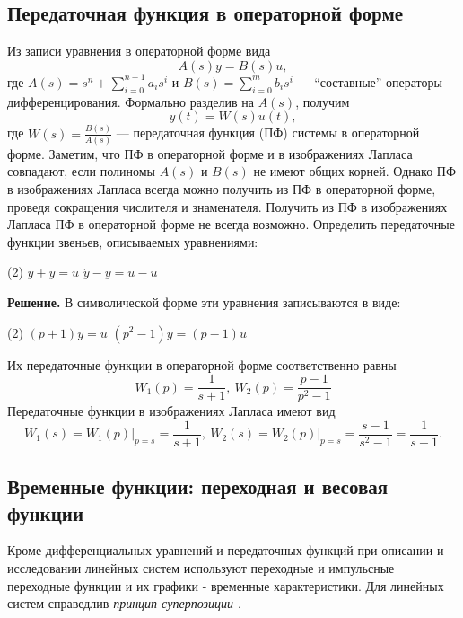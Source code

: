 \documentclass[../../TAU.tex]{subfiles}
\begin{document}
\subsection{Передаточная функция в операторной форме} %
    Из записи уравнения  в операторной форме вида
    \begin{equation}\label{EQ_ODU_SYM_1}
        A(s)y = B(s)u,
    \end{equation}
    где 
    $A(s) = s^n + \sum_{i=0}^{n-1}a_is^i$ и 
    $B(s) = \sum_{i=0}^{m}b_is^i$ --- ``составные'' операторы дифференцирования.
    Формально разделив  на $A(s)$, получим
    \begin{equation}
        y(t) = W(s)u(t),
    \end{equation}
    где 
    $W(s) = \frac{B(s)}{A(s)}$ --- передаточная функция (ПФ) системы  в операторной форме.
    Заметим, что ПФ в операторной форме и в изображениях Лапласа совпадают, если полиномы $A(s)$ и $B(s)$ не имеют общих корней. Однако ПФ в изображениях Лапласа всегда можно получить из ПФ в операторной форме, проведя сокращения числителя и знаменателя. Получить из ПФ в изображениях Лапласа ПФ в операторной форме не всегда возможно.
    \examp Определить передаточные функции звеньев, описываемых уравнениями:
    \begin{tasks}(2)
        \task $\dot y + y = u$
        \task $\ddot y - y = \dot u - u$
    \end{tasks}
    {\bf Решение.}
    В символической форме эти уравнения записываются в виде:
    \begin{tasks}(2)
        \task $(p+1) y = u$
        \task $(p^2-1) y = (p-1) u$
    \end{tasks}
    Их передаточные функции в операторной форме соответственно равны
    $$
        W_1(p)=\frac{1}{s+1}, \ W_2(p)= \frac{p-1}{p^2-1}
    $$
    Передаточные функции в изображениях Лапласа имеют вид
    $$
        \left.W_1(s)=W_1(p)\right\vert_{p=s} = \frac{1}{s+1}, \ 
        \left.W_2(s)=W_2(p)\right\vert_{p=s} = \frac{s-1}{s^2-1} = \frac{1}{s+1}.
    $$
\subsection{Временные функции: переходная и весовая функции} %
    Кроме дифференциальных уравнений и передаточных функций при описании и исследовании линейных систем используют переходные и импульсные переходные функции и их графики - временные характеристики.
    Для линейных систем справедлив {\it принцип суперпозиции \cite[стр. 35]{kim:uch}}. 
\end{document}
